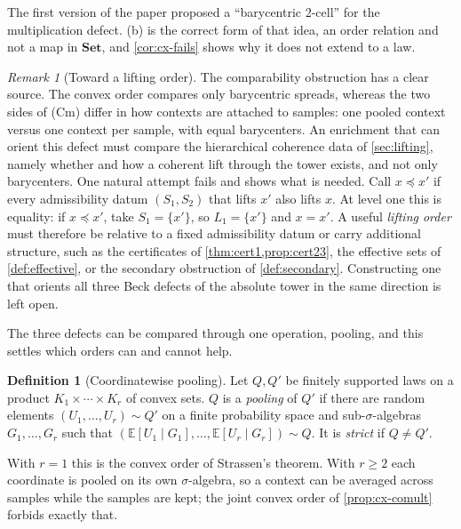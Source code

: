 \documentclass[11pt]{article}
\theoremstyle{definition}
\newtheorem{definition}[theorem]{Definition}
\theoremstyle{remark}
\newtheorem{remark}[theorem]{Remark}
\newcommand{\Set}{\mathbf{Set}}
\begin{document}
The first version of the paper proposed a ``barycentric 2-cell'' for the multiplication defect.
(b) is the correct form of that idea, an order relation and not a map in $\Set$, and
\cref{cor:cx-fails} shows why it does not extend to a law.

\begin{remark}[Toward a lifting order]\label{rem:lift-order}
The comparability obstruction has a clear source. The convex order compares only barycentric
spreads, whereas the two sides of (Cm) differ in how contexts are attached to samples: one pooled
context versus one context per sample, with equal barycenters. An enrichment that can orient this
defect must compare the hierarchical coherence data of \cref{sec:lifting}, namely whether and how a
coherent lift through the tower exists, and not only barycenters. One natural attempt fails and shows
what is needed. Call $x\preceq x'$ if every admissibility datum $(S_1,S_2)$ that lifts $x'$ also lifts
$x$. At level one this is equality: if $x\preceq x'$, take $S_1=\{x'\}$, so $L_1=\{x'\}$ and $x=x'$. A
useful \emph{lifting order} must therefore be relative to a fixed admissibility datum or carry
additional structure, such as the certificates of \cref{thm:cert1,prop:cert23}, the effective sets of
\cref{def:effective}, or the secondary obstruction of \cref{def:secondary}. Constructing one that
orients all three Beck defects of the absolute tower in the same direction is left open.
\end{remark}

The three defects can be compared through one operation, pooling, and this settles which orders can and cannot help.

\begin{definition}[Coordinatewise pooling]\label{def:pooling}
Let $Q,Q'$ be finitely supported laws on a product $K_1\times\cdots\times K_r$ of convex sets. $Q$ is a \emph{pooling} of $Q'$ if
there are random elements $(U_1,\dots,U_r)\sim Q'$ on a finite probability space and sub-$\sigma$-algebras $G_1,\dots,G_r$ such that
$(\mathbb E[U_1\mid G_1],\dots,\mathbb E[U_r\mid G_r])\sim Q$. It is \emph{strict} if $Q\ne Q'$.
\end{definition}

With $r=1$ this is the convex order of Strassen's theorem. With $r\ge2$ each coordinate is pooled on its own $\sigma$-algebra, so a
context can be averaged across samples while the samples are kept; the joint convex order of \cref{prop:cx-comult} forbids exactly
that.
\end{document}
